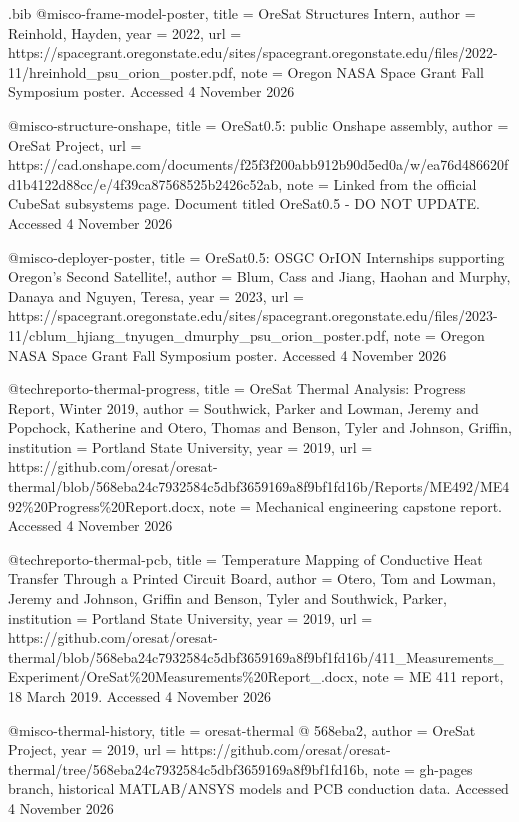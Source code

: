 \begin{filecontents*}[overwrite]{\jobname.bib}
@misc{o-frame-model-poster,
  title = {{OreSat Structures Intern}},
  author = {Reinhold, Hayden},
  year = {2022},
  url = {https://spacegrant.oregonstate.edu/sites/spacegrant.oregonstate.edu/files/2022-11/hreinhold_psu_orion_poster.pdf},
  note = {Oregon NASA Space Grant Fall Symposium poster. Accessed 4 November 2026}
}

@misc{o-structure-onshape,
  title = {{OreSat0.5: public Onshape assembly}},
  author = {{OreSat Project}},
  url = {https://cad.onshape.com/documents/f25f3f200abb912b90d5ed0a/w/ea76d486620fd1b4122d88cc/e/4f39ca87568525b2426c52ab},
  note = {Linked from the official CubeSat subsystems page. Document titled OreSat0.5 - DO NOT UPDATE. Accessed 4 November 2026}
}

@misc{o-deployer-poster,
  title = {{OreSat0.5: OSGC OrION Internships supporting Oregon's Second Satellite!}},
  author = {Blum, Cass and Jiang, Haohan and Murphy, Danaya and Nguyen, Teresa},
  year = {2023},
  url = {https://spacegrant.oregonstate.edu/sites/spacegrant.oregonstate.edu/files/2023-11/cblum_hjiang_tnyugen_dmurphy_psu_orion_poster.pdf},
  note = {Oregon NASA Space Grant Fall Symposium poster. Accessed 4 November 2026}
}

@techreport{o-thermal-progress,
  title = {{OreSat Thermal Analysis: Progress Report, Winter 2019}},
  author = {Southwick, Parker and Lowman, Jeremy and Popchock, Katherine and Otero, Thomas and Benson, Tyler and Johnson, Griffin},
  institution = {Portland State University},
  year = {2019},
  url = {https://github.com/oresat/oresat-thermal/blob/568eba24c7932584c5dbf3659169a8f9bf1fd16b/Reports/ME492/ME492\%20Progress\%20Report.docx},
  note = {Mechanical engineering capstone report. Accessed 4 November 2026}
}

@techreport{o-thermal-pcb,
  title = {{Temperature Mapping of Conductive Heat Transfer Through a Printed Circuit Board}},
  author = {Otero, Tom and Lowman, Jeremy and Johnson, Griffin and Benson, Tyler and Southwick, Parker},
  institution = {Portland State University},
  year = {2019},
  url = {https://github.com/oresat/oresat-thermal/blob/568eba24c7932584c5dbf3659169a8f9bf1fd16b/411_Measurements_Experiment/OreSat\%20Measurements\%20Report_.docx},
  note = {ME 411 report, 18 March 2019. Accessed 4 November 2026}
}

@misc{o-thermal-history,
  title = {{oresat-\allowbreak{}thermal @ 568eba2}},
  author = {{OreSat Project}},
  year = {2019},
  url = {https://github.com/oresat/oresat-thermal/tree/568eba24c7932584c5dbf3659169a8f9bf1fd16b},
  note = {gh-pages branch, historical MATLAB/ANSYS models and PCB conduction data. Accessed 4 November 2026}
}


\end{filecontents*}

